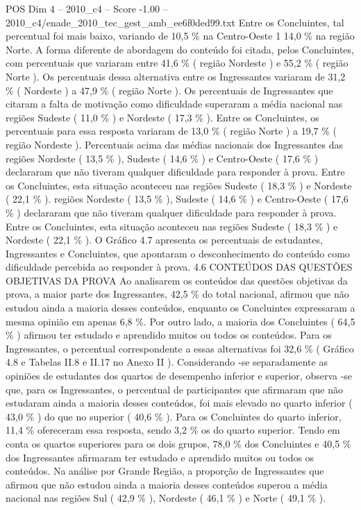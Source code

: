 \begin{textsample}{POS Dim 4 – 2010\_c4 – Score -1.00 – 2010\_c4/enade\_2010\_tec\_gest\_amb\_ee6f0ded99.txt}
Entre os Concluintes, tal percentual foi mais baixo, variando de 10,5 \% na Centro-Oeste 1 14,0 \% na região Norte.
A forma diferente de abordagem do conteúdo foi citada, pelos Concluintes, com percentuais que variaram entre 41,6 \% ( região Nordeste ) e 55,2 \% ( região Norte ).
Os percentuais dessa alternativa entre os Ingressantes variaram de 31,2 \% ( Nordeste ) a 47,9 \% ( região Norte ).
Os percentuais de Ingressantes que citaram a falta de motivação como dificuldade superaram a média nacional nas regiões Sudeste ( 11,0 \% ) e Nordeste ( 17,3 \% ).
Entre os Concluintes, os percentuais para essa resposta variaram de 13,0 \% ( região Norte ) a 19,7 \% ( região Nordeste ).
Percentuais acima das médias nacionais dos Ingressantes das regiões Nordeste ( 13,5 \% ), Sudeste ( 14,6 \% ) e Centro-Oeste ( 17,6 \% ) declararam que não tiveram qualquer dificuldade para responder à prova.
Entre os Concluintes, esta situação aconteceu nas regiões Sudeste ( 18,3 \% ) e Nordeste ( 22,1 \% ). regiões Nordeste ( 13,5 \% ), Sudeste ( 14,6 \% ) e Centro-Oeste ( 17,6 \% ) declararam que não tiveram qualquer dificuldade para responder à prova.
Entre os Concluintes, esta situação aconteceu nas regiões Sudeste ( 18,3 \% ) e Nordeste ( 22,1 \% ).
O Gráfico 4.7 apresenta os percentuais de estudantes, Ingressantes e Concluintes, que apontaram o desconhecimento do conteúdo como dificuldade percebida ao responder à prova. 4.6 CONTEÚDOS DAS QUESTÕES OBJETIVAS DA PROVA Ao analisarem os conteúdos das questões objetivas da prova, a maior parte dos Ingressantes, 42,5 \% do total nacional, afirmou que não estudou ainda a maioria desses conteúdos, enquanto os Concluintes expressaram a mesma opinião em apenas 6,8 \%.
Por outro lado, a maioria dos Concluintes ( 64,5 \% ) afirmou ter estudado e aprendido muitos ou todos os conteúdos.
Para os Ingressantes, o percentual correspondente a essas alternativas foi 32,6 \% ( Gráfico 4.8 e Tabelas II.8 e II.17 no Anexo II ).
Considerando -se separadamente as opiniões de estudantes dos quartos de desempenho inferior e superior, observa -se que, para os Ingressantes, o percentual de participantes que afirmaram que não estudaram ainda a maioria desses conteúdos, foi mais elevado no quarto inferior ( 43,0 \% ) do que no superior ( 40,6 \% ).
Para os Concluintes do quarto inferior, 11,4 \% ofereceram essa resposta, sendo 3,2 \% os do quarto superior.
Tendo em conta os quartos superiores para os dois grupos, 78,0 \% dos Concluintes e 40,5 \% dos Ingressantes afirmaram ter estudado e aprendido muitos ou todos os conteúdos.
Na análise por Grande Região, a proporção de Ingressantes que afirmou que não estudou ainda a maioria desses conteúdos superou a média nacional nas regiões Sul ( 42,9 \% ), Nordeste ( 46,1 \% ) e Norte ( 49,1 \% ).

\end{textsample}
